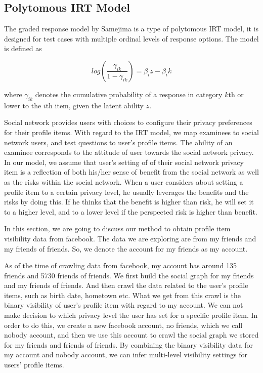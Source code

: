 \documentclass[a4paper]{article}
\begin{document}
\subsection{Polytomous IRT Model}
The graded response model by Samejima is a type of polytomous IRT
model, it is designed for test cases with multiple ordinal levels of
response options. The model is defined as  

\[ log(\frac{\gamma_{ik}}{1-\gamma_{ik}}) = \beta_iz - \beta_ik \]

where $\gamma_{ik}$ denotes the cumulative probability of a response
in category $k$th or lower to the $i$th item, given the latent ability
$z$.

Social network provides users with choices to configure their privacy
preferences for their profile items. With regard to the IRT model, we
map examinees to social network users, and test questions to user's
profile items. The ability of an examinee corresponds to the attitude
of user towards the social network privacy. In our model, we assume
that user's setting of of their social network privacy item is a
reflection of both his/her sense of benefit from the social network
as well as the risks within the social network. When a user considers
about setting a profile item to a certain privacy level, he usually
leverages the benefits and the risks by doing this. If he thinks that
the benefit is higher than risk, he will set it to a higher level, and
to a lower level if the perspected risk is higher than benefit. 

In this section, we are going to discuss our method to obtain profile
item visibility data from facebook. The data we are exploring are from
my friends and my friends of friends. So, we denote the account for my
friends as my account. 

As of the time of crawling data from facebook, my account has around
135 friends and 5730 friends of friends. We first build the social
graph for my friends and my friends of friends. And then crawl the
data related to the user's profile items, such as birth date, hometown
etc. What we get from this crawl is the binary visibility of user's
profile item with regard to my account. We can not make decision to 
which privacy level the user has set for a specific profile item. In
order to do this, we create a new facebook account, no friends, which
we call nobody account, and then we use this account to crawl the
social graph we stored for my friends and friends of friends. By
combining the binary visibility data for my account and nobody
account, we can infer multi-level visibility settings for users'
profile items. 
\end{document}
